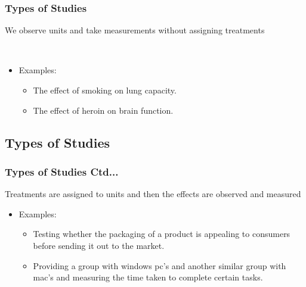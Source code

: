 \documentclass[xcolor=svgnames, compress]{beamer}
\begin{document}
\begin{frame}
\frametitle{Types of Studies}

\vspace{-0.5cm}

\begin{definition}
\justifying
We observe units and take measurements without assigning treatments
\end{definition}


\hfill\\
\begin{itemize}
\item	Examples:
	\begin{itemize}\justifying
	\item	The effect of smoking on lung capacity.
	\item	The effect of heroin on brain function.
	\end{itemize}
\end{itemize}

\end{frame}




\subsection*{Types of Studies}

\begin{frame}
\frametitle{Types of Studies Ctd...}

\vspace{-0.50cm}

\begin{definition}
\justifying
Treatments are assigned to units and then the effects are observed and measured
\end{definition}

\vspace{0.25cm}

\begin{itemize}
\item	Examples:
	\begin{itemize}\justifying
	\item	Testing whether the packaging of a product is appealing to consumers before sending it out to the market.\\[1.00em]
	\item Providing a group with windows pc's and another similar group with mac's and measuring the time taken to complete certain tasks.
	\end{itemize}
\end{itemize}
\end{frame}
\end{document}

